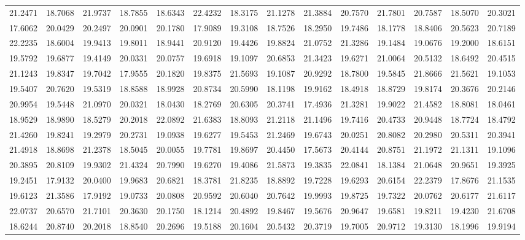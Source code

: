 \documentclass[12pt]{article}\usepackage[]{graphicx}\usepackage[]{color}
\begin{document}
\begin{landscape}
\begin{longtable}[t]{rrrrrrrrrrrrrr}
21.2471 & 18.7068 & 21.9737 & 18.7855 & 18.6343 & 22.4232 & 18.3175 & 21.1278 & 21.3884 & 20.7570 & 21.7801 & 20.7587 & 18.5070 & 20.3021\\
17.6062 & 20.0429 & 20.2497 & 20.0901 & 20.1780 & 17.9089 & 19.3108 & 18.7526 & 18.2950 & 19.7486 & 18.1778 & 18.8406 & 20.5623 & 20.7189\\
22.2235 & 18.6004 & 19.9413 & 19.8011 & 18.9441 & 20.9120 & 19.4426 & 19.8824 & 21.0752 & 21.3286 & 19.1484 & 19.0676 & 19.2000 & 18.6151\\
19.5792 & 19.6877 & 19.4149 & 20.0331 & 20.0757 & 19.6918 & 19.1097 & 20.6853 & 21.3423 & 19.6271 & 21.0064 & 20.5132 & 18.6492 & 20.4515\\
21.1243 & 19.8347 & 19.7042 & 17.9555 & 20.1820 & 19.8375 & 21.5693 & 19.1087 & 20.9292 & 18.7800 & 19.5845 & 21.8666 & 21.5621 & 19.1053\\
19.5407 & 20.7620 & 19.5319 & 18.8588 & 18.9928 & 20.8734 & 20.5990 & 18.1198 & 19.9162 & 18.4918 & 18.8729 & 19.8174 & 20.3676 & 20.2146\\
20.9954 & 19.5448 & 21.0970 & 20.0321 & 18.0430 & 18.2769 & 20.6305 & 20.3741 & 17.4936 & 21.3281 & 19.9022 & 21.4582 & 18.8081 & 18.0461\\
18.9529 & 18.9890 & 18.5279 & 20.2018 & 22.0892 & 21.6383 & 18.8093 & 21.2118 & 21.1496 & 19.7416 & 20.4733 & 20.9448 & 18.7724 & 18.4792\\
21.4260 & 19.8241 & 19.2979 & 20.2731 & 19.0938 & 19.6277 & 19.5453 & 21.2469 & 19.6743 & 20.0251 & 20.8082 & 20.2980 & 20.5311 & 20.3941\\
21.4918 & 18.8698 & 21.2378 & 18.5045 & 20.0055 & 19.7781 & 19.8697 & 20.4450 & 17.5673 & 20.4144 & 20.8751 & 21.1972 & 21.1311 & 19.1096\\
20.3895 & 20.8109 & 19.9302 & 21.4324 & 20.7990 & 19.6270 & 19.4086 & 21.5873 & 19.3835 & 22.0841 & 18.1384 & 21.0648 & 20.9651 & 19.3925\\
19.2451 & 17.9132 & 20.0400 & 19.9683 & 20.6821 & 18.3781 & 21.8235 & 18.8892 & 19.7228 & 19.6293 & 20.6154 & 22.2379 & 17.8676 & 21.1535\\
19.6123 & 21.3586 & 17.9192 & 19.0733 & 20.0808 & 20.9592 & 20.6040 & 20.7642 & 19.9993 & 19.8725 & 19.7322 & 20.0762 & 20.6177 & 21.6117\\
22.0737 & 20.6570 & 21.7101 & 20.3630 & 20.1750 & 18.1214 & 20.4892 & 19.8467 & 19.5676 & 20.9647 & 19.6581 & 19.8211 & 19.4230 & 21.6708\\
18.6244 & 20.8740 & 20.2018 & 18.8540 & 20.2696 & 19.5188 & 20.1604 & 20.5432 & 20.3719 & 19.7005 & 20.9712 & 19.3130 & 18.1996 & 19.9194\\

\end{longtable}
\end{landscape}
\end{document}
